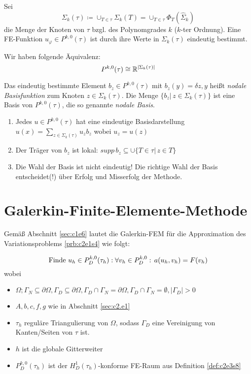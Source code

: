 \documentclass[../skript.tex]{subfiles}
\begin{document}
\begin{corollary}
	Sei
	\[
		\Sigma_k(\tau) \coloneqq \cup_{T\in\tau} \Sigma_k(T) = \cup_{T\in\tau}\Phi_T(\hat{\Sigma}_k)
	\]
	die Menge der Knoten von $\tau$ bzgl. des Polynomgrades $k$ ($k$-ter Ordnung). Eine FE-Funktion $u_\varphi\in P^{k,0}(\tau)$ ist durch ihre Werte in $\Sigma_k(\tau)$ eindeutig bestimmt. 
\end{corollary}
\begin{remark*}
	Wir haben folgende Äquivalenz: 
	\[
		P^{k,0}(\tau) \cong \mathbb{R}^{\vert\Sigma_k(\tau)\vert}
	\]
\end{remark*}
\begin{definition}\label{def:c2e3s11}
	Das eindeutig bestimmte Element $b_z\in P^{k,0}(\tau)$ mit $b_z(y) = \delta{z,y}$ heißt \emph{nodale Basisfunktion} zum Knoten $z\in\Sigma_k(\tau)$. Die Menge $\{b_z\vert\,z\in\Sigma_k(\tau)\}$ ist eine Basis von $P^{k,0}(\tau)$, die so genannte \emph{nodale Basis}.
\end{definition} 
\begin{remark}\label{rem:c2e3s12}
	\begin{enumerate}%
		\item Jedes $u\in P^{k,0}(\tau)$ hat eine eindeutige Basisdarstellung $u(x) = \sum_{z\in\Sigma_k(\tau)} u_z b_z$ wobei $u_z = u(z)$
		\item Der Träger von $b_z$ ist lokal: $supp\,b_z\subseteq \cup\{T\in\tau\vert\,z\in T\}$
		\item Die Wahl der Basis ist nicht eindeutig! Die richtige Wahl der Basis entscheidet(!) über Erfolg und Misserfolg der Methode.
	\end{enumerate}
 \end{remark}


 \section{Galerkin-Finite-Elemente-Methode}\label{sec:c2e4}
Gemäß Abschnitt \cref{sec:c1e6} lautet die Galerkin-FEM für die Approximation des Variationsproblems \cref{prb:c2e1s4} wie folgt:

\begin{problem}\label{prb:c2e4s1}
	\[
		\text{Finde } u_h\in P^{k,0}_D(\tau_h):\\
		\forall v_h\in P^{k,0}_D:\,a(u_h,v_h) = F(v_h)
	\]
	wobei
	\begin{itemize}
		\item $\Omega;\Gamma_N\subseteq\partial\Omega, \Gamma_D\subseteq\partial\Omega,\Gamma_D\cap\Gamma_N=\partial\Omega,\Gamma_D\cap\Gamma_N=\emptyset,\vert\Gamma_D\vert > 0$
		\item $A,b,c,f,g$ wie in Abschnitt \cref{sec:c2.e1}
		\item $\tau_h$ reguläre Triangulierung von $\Omega$, sodass $\Gamma_D$ eine Vereinigung von Kanten/Seiten von $\tau$ ist. 
		\item $h$ ist die globale Gitterweiter
		\item $P^{k,0}_D(\tau_h)$ ist der $H^1_D(\tau_h)$-konforme FE-Raum aus Definition \cref{def:c2e3s8}
	\end{itemize}
 \end{problem}
\end{document}
